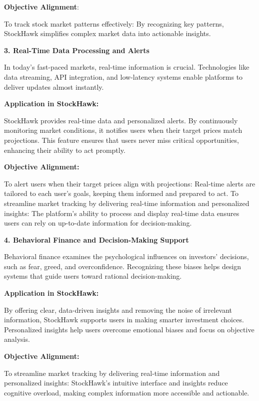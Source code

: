\textbf{Objective Alignment}:

To track stock market patterns effectively: By recognizing key patterns, StockHawk simplifies complex market data into actionable insights.

\textbf{3. Real-Time Data Processing and Alerts}

In today’s fast-paced markets, real-time information is crucial. Technologies like data streaming, API integration, and low-latency systems enable platforms to deliver updates almost instantly.

\textbf{
Application in StockHawk:}

StockHawk provides real-time data and personalized alerts. By continuously monitoring market conditions, it notifies users when their target prices match projections. This feature ensures that users never miss critical opportunities, enhancing their ability to act promptly.

\textbf{Objective Alignment:}

To alert users when their target prices align with projections: Real-time alerts are tailored to each user’s goals, keeping them informed and prepared to act.
To streamline market tracking by delivering real-time information and personalized insights: The platform’s ability to process and display real-time data ensures users can rely on up-to-date information for decision-making.

\textbf{4. Behavioral Finance and Decision-Making Support}

Behavioral finance examines the psychological influences on investors’ decisions, such as fear, greed, and overconfidence. Recognizing these biases helps design systems that guide users toward rational decision-making.

\textbf{Application in StockHawk:}

By offering clear, data-driven insights and removing the noise of irrelevant information, StockHawk supports users in making smarter investment choices. Personalized insights help users overcome emotional biases and focus on objective analysis.

\textbf{Objective Alignment:}

To streamline market tracking by delivering real-time information and personalized insights: StockHawk’s intuitive interface and insights reduce cognitive overload, making complex information more accessible and actionable.



